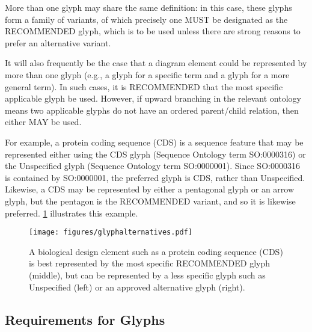 More than one glyph may share the same definition: in this case, these glyphs form a family of variants, of which precisely one MUST be designated as the RECOMMENDED glyph, which is to be used unless there are strong reasons to prefer an alternative variant.

It will also frequently be the case that a diagram element could be represented by more than one glyph (e.g., a glyph for a specific term and a glyph for a more general term).
In such cases, it is RECOMMENDED that the most specific applicable glyph be used.
However, if upward branching in the relevant ontology means two applicable glyphs do not have an ordered parent/child relation, then either MAY be used.

For example, a protein coding sequence (CDS) is a sequence feature that may be represented either using the CDS glyph (Sequence Ontology term SO:0000316) or the Unspecified glyph (Sequence Ontology term SO:0000001).  
Since SO:0000316 is contained by SO:0000001, the preferred glyph is CDS, rather than Unspecified.
Likewise, a CDS may be represented by either a pentagonal glyph or an arrow glyph, but the pentagon is the RECOMMENDED variant, and so it is likewise preferred.  
\ref{f:glyphalternatives} illustrates this example.

\begin{figure}[h!]
\centering
\texttt{[image: figures/glyphalternatives.pdf]}
\caption{A biological design element such as a protein coding sequence (CDS) is best represented by the most specific RECOMMENDED glyph (middle), but can be represented by a less specific glyph such as Unspecified (left) or an approved alternative glyph (right).}
\label{f:glyphalternatives}
\end{figure}

\subsection{Requirements for Glyphs}

